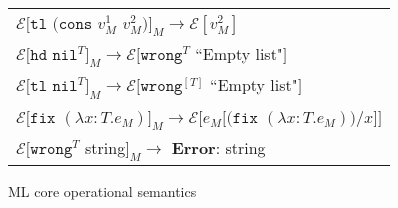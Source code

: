 \begin{figure}[p]
\begin{tabular}{l}
\vspace{5pt}

$\mathscr{E}[\mathtt{tl}$ $(\mathtt{cons}$ $v_{M}^{1}$ $v_{M}^{2})]_{M}\rightarrow\mathscr{E}[v_{M}^{2}]$ \\

\vspace{5pt}

$\mathscr{E}[\mathtt{hd}$ $\mathtt{nil}^{T}]_{M}\rightarrow\mathscr{E}[\mathtt{wrong}^{T}$ ``Empty list"$]$ \\

\vspace{5pt}

$\mathscr{E}[\mathtt{tl}$ $\mathtt{nil}^{T}]_{M}\rightarrow\mathscr{E}[\mathtt{wrong}^{[T]}$ ``Empty list"$]$ \\

\vspace{5pt}

$\mathscr{E}[\mathtt{fix}$ $(\lambda x:T.e_{M})]_{M}\rightarrow\mathscr{E}[e_{M}[(\mathtt{fix}$ $(\lambda x:T.e_{M}))/x]]$ \\

\vspace{5pt}

$\mathscr{E}[\mathtt{wrong}^{T}$ string$]_{M}\rightarrow$ \textbf{Error}: string 
\end{tabular}
\caption{ML core operational semantics}
\label{cmos}
\end{figure}